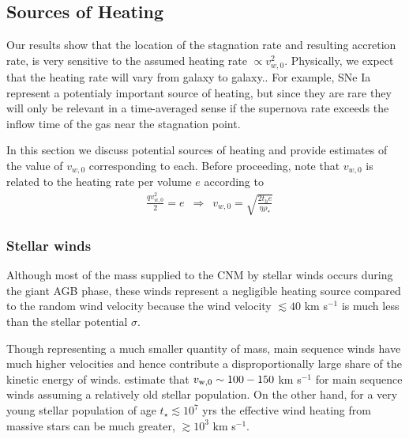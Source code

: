 \documentclass[usenatbib,fleqn]{mn2e}
\newcommand{\rhostar}{\rho_*}
\newcommand{\vwO}{v_{w,0}}
\begin{document}
\subsection{Sources of Heating}
\label{sec:heating}

Our results show that the location of the stagnation rate and
resulting accretion rate, is very sensitive to the assumed heating
rate $\propto v_{w,0}^{2}$.  Physically, we expect that the heating
rate will vary from galaxy to galaxy.. For example, SNe Ia represent a
potentialy important source of heating, but since they are rare they
will only be relevant in a time-averaged sense if the supernova rate
exceeds the inflow time of the gas near the stagnation point.

In this section we discuss potential sources of heating and provide estimates of the value of $\vwO$ corresponding to each.  Before proceeding, note that $\vwO$ is related to the heating rate per volume $e$ according to 
\begin{align}
  &\frac{q \vwO^2}{2}=e \,\,\,\Rightarrow\,\,\,\vwO = \sqrt{\frac{2 t_h e}{\eta \rhostar}}
  \label{eq:vw_eff}
\end{align}

\subsubsection{Stellar winds} Although most of the mass supplied to
the CNM by stellar winds occurs during the giant AGB phase, these
winds represent a negligible heating source compared to the random
wind velocity because the wind velocity $\lesssim 40$ km s$^{-1}$ is
much less than the stellar potential $\sigma$.

Though representing a much smaller quantity of mass, main sequence
winds have much higher velocities and hence contribute a
disproportionally large share of the kinetic energy of winds.
\citep{NaimanSoares-Furtado+:2013a} estimate that $v_{\rm w,0} \sim
100-150$ km s$^{-1}$ for main sequence winds assuming a relatively old
stellar population.  On the other hand, for a very young stellar
population of age $t_{\star} \lesssim 10^{7}$ yrs the effective wind
heating from massive stars can be much greater, $\gtrsim 10^{3}$ km
s$^{-1}$.  
\end{document}
